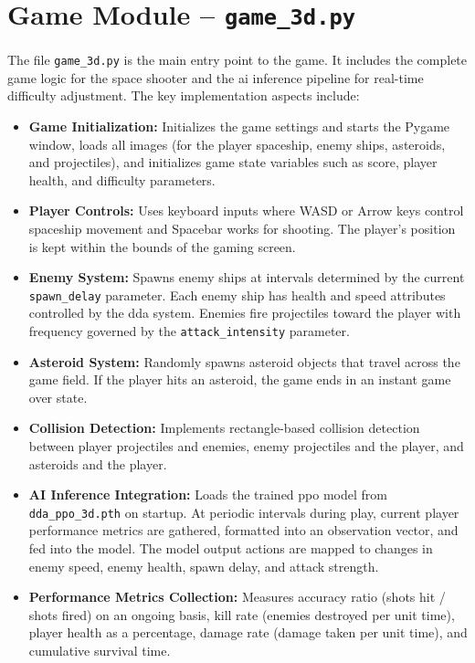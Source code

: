\section{Game Module -- \texttt{game\_3d.py}}
\paragraph{} The file \texttt{game\_3d.py} is the main entry point to the game. It includes the complete game logic for the space shooter and the \ac{ai} inference pipeline for real-time difficulty adjustment. The key implementation aspects include:

\begin{itemize}
	\item \textbf{Game Initialization:} Initializes the game settings and starts the Pygame window, loads all images (for the player spaceship, enemy ships, asteroids, and projectiles), and initializes game state variables such as score, player health, and difficulty parameters.
	\item \textbf{Player Controls:} Uses keyboard inputs where WASD or Arrow keys control spaceship movement and Spacebar works for shooting. The player's position is kept within the bounds of the gaming screen.
	\item \textbf{Enemy System:} Spawns enemy ships at intervals determined by the current \texttt{spawn\_delay} parameter. Each enemy ship has health and speed attributes controlled by the \ac{dda} system. Enemies fire projectiles toward the player with frequency governed by the \texttt{attack\_intensity} parameter.
	\item \textbf{Asteroid System:} Randomly spawns asteroid objects that travel across the game field. If the player hits an asteroid, the game ends in an instant game over state.
	\item \textbf{Collision Detection:} Implements rectangle-based collision detection between player projectiles and enemies, enemy projectiles and the player, and asteroids and the player.
	\item \textbf{AI Inference Integration:} Loads the trained \ac{ppo} model from \texttt{dda\_ppo\_3d.pth} on startup. At periodic intervals during play, current player performance metrics are gathered, formatted into an observation vector, and fed into the model. The model output actions are mapped to changes in enemy speed, enemy health, spawn delay, and attack strength.
	\item \textbf{Performance Metrics Collection:} Measures accuracy ratio (shots hit / shots fired) on an ongoing basis, kill rate (enemies destroyed per unit time), player health as a percentage, damage rate (damage taken per unit time), and cumulative survival time.
\end{itemize}

